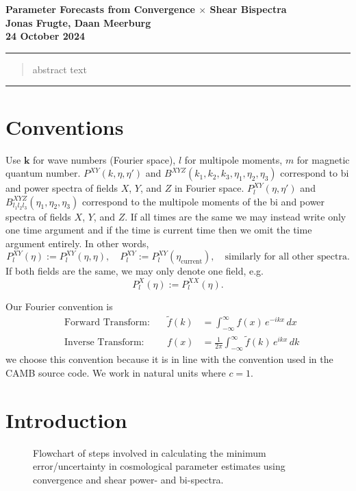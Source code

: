 \documentclass[11pt]{article} %
\begin{document}
\textbf{
    \Huge \noindent 
    Parameter Forecasts from Convergence $\times$ Shear Bispectra 
    \vspace{0.5cm}
    \\
    \normalsize
    Jonas Frugte, Daan Meerburg\\
    24 October 2024
    }\\
\vspace{0.5cm}
\hrule

\begin{abstract}
    abstract text
\end{abstract}
\vspace{0.5cm}
\hrule

\tableofcontents
\pagebreak
\section{Conventions}
Use $\mathbf k$ for wave numbers (Fourier space), $l$ for multipole moments, $m$ for magnetic quantum number. $P^{XY}(k, \eta, \eta')$ and $B^{XYZ}(k_1,k_2,k_3, \eta_1, \eta_2, \eta_3)$ correspond to bi and power spectra of fields $X$, $Y$, and $Z$ in Fourier space. $P_l^{XY}(\eta,\eta')$ and $B_{l_1l_2l_3}^{XYZ}(\eta_1, \eta_2, \eta_3)$ correspond to the multipole moments of the bi and power spectra of fields $X$, $Y$, and $Z$. If all times are the same we may instead write only one time argument and if the time is current time then we omit the time argument entirely. In other words,
$$
P_l^{XY}(\eta):=P_l^{XY}(\eta,\eta), \quad P_l^{XY}:=P_l^{XY}(\eta_{\text{current}}), \quad \text{similarly for all other spectra}.
$$
If both fields are the same, we may only denote one field, e.g. 
$$
P_l^{X}(\eta) := P_l^{XX}(\eta).
$$

Our Fourier convention is
\begin{align}
    &\text{Forward Transform:} & \quad \tilde{f}(k) &= \int_{-\infty}^{\infty} f(x) \, e^{-i k x} \, dx\\
    &\text{Inverse Transform:} & \quad f(x) &= \frac{1}{2\pi} \int_{-\infty}^{\infty} \tilde{f}(k) \, e^{i k x} \, dk
\end{align}
we choose this convention because it is in line with the convention used in the CAMB source code. We work in natural units where $c=1$.

\section{Introduction}

\begin{figure}[h!]
    \centering
    
    \caption{Flowchart of steps involved in calculating the minimum error/uncertainty in cosmological parameter estimates using convergence and shear power- and bi-spectra.}
\end{figure}
\end{document}

